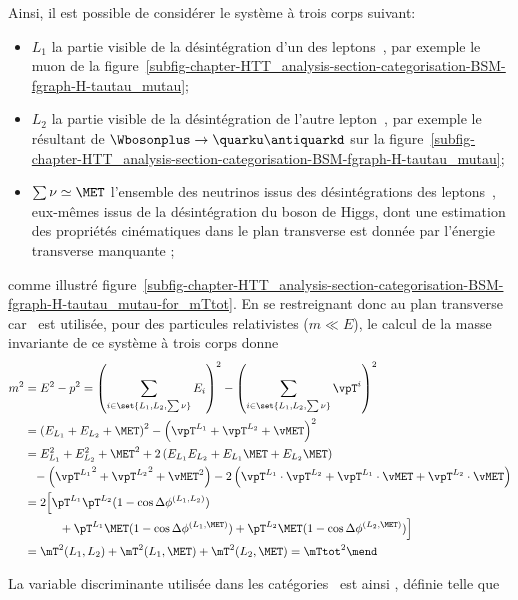 \par
Ainsi, il est possible de considérer le système à trois corps suivant:
\begin{itemize}
\item $L_1$ la partie visible de la désintégration d'un des leptons~\tau, par exemple le muon de la figure~\ref{subfig-chapter-HTT_analysis-section-categorisation-BSM-fgraph-H-tautau_mutau};
\item $L_2$ la partie visible de la désintégration de l'autre lepton~\tau, par exemple le \tauh résultant de $\Wbosonplus\to\quarku\antiquarkd$ sur la figure~\ref{subfig-chapter-HTT_analysis-section-categorisation-BSM-fgraph-H-tautau_mutau};
\item $\sum\nu\simeq\MET$ l'ensemble des neutrinos issus des désintégrations des leptons~\tau, eux-mêmes issus de la désintégration du boson de Higgs, dont une estimation des propriétés cinématiques dans le plan transverse est donnée par l'énergie transverse manquante \vMET;
\end{itemize}
comme illustré figure~\ref{subfig-chapter-HTT_analysis-section-categorisation-BSM-fgraph-H-tautau_mutau-for_mTtot}.
En se restreignant donc au plan transverse car \MET\ est utilisée,
pour des particules relativistes ($m\ll E$),
le calcul de la \og masse invariante \fg{} de ce système à trois corps donne
\begin{align}
m^2 &= E^2 - p^2
= \left( \sum_{i \in \set{L_1,L_2,\sum\nu}} E_i \right)^2 - \left( \sum_{i \in \set{L_1,L_2,\sum\nu}} \vpT^i \right)^2
\nonumber\\
&= \left( E_{L_1} + E_{L_2} + \MET \right)^2 - \left( \vpT^{L_1} + \vpT^{L_2} + \vMET \right)^2
\nonumber\\
&= E_{L_1}^2 + E_{L_2}^2 + \MET^2 + 2 \left( E_{L_1}E_{L_2} + E_{L_1}\MET + E_{L_2}\MET \right)
\nonumber\\
&\hphantom{=} - \left( {\vpT^{L_1}}^2 + {\vpT^{L_2}}^2 + {\vMET}^2 \right) - 2 \left( \vpT^{L_1}\cdot\vpT^{L_2} + \vpT^{L_1}\cdot\vMET + \vpT^{L_2}\cdot\vMET \right)
\nonumber\\
&= 2 \Big[ \pT^{L_1}\pT^{L_2}(1-\cos\Delta\phi^{(L_1,L_2)})
\nonumber\\
&\hphantom{=2(} \quad + \pT^{L_1}\MET(1-\cos\Delta\phi^{(L_1,\MET)}) + \pT^{L_2}\MET(1-\cos\Delta\phi^{(L_2,\MET)}) \Big]
\nonumber\\
&= \mT^2 (L_1,L_2) + \mT^2 (L_1,\MET) + \mT^2 (L_2,\MET) = {\mTtot}^2
\mend
\end{align}
\par
La variable discriminante utilisée dans les catégories \CATbsm\ est ainsi \mTtot, définie telle que
